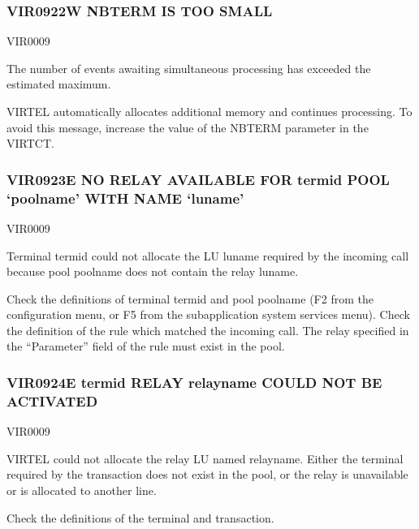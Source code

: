 \documentclass[letterpaper,10pt,english]{sphinxmanual}
\begin{document}
\subsubsection{VIR0922W NBTERM IS TOO SMALL}
\label{\detokenize{messages:vir0922w-nbterm-is-too-small}}\begin{description}
\sphinxAtStartPar
VIR0009

\sphinxAtStartPar
The number of events awaiting simultaneous processing has exceeded the estimated maximum.

\sphinxAtStartPar
VIRTEL automatically allocates additional memory and continues processing. To avoid this message, increase the value of the NBTERM parameter in the VIRTCT.

\end{description}


\subsubsection{VIR0923E NO RELAY AVAILABLE FOR termid POOL ‘poolname’ WITH NAME ‘luname’}
\label{\detokenize{messages:vir0923e-no-relay-available-for-termid-pool-poolname-with-name-luname}}\begin{description}
\sphinxAtStartPar
VIR0009

\sphinxAtStartPar
Terminal termid could not allocate the LU luname required by the incoming call because pool poolname does not contain the relay luname.

\sphinxAtStartPar
Check the definitions of terminal termid and pool poolname (F2 from the configuration menu, or F5 from the sub\sphinxhyphen{}application system services menu). Check the definition of the rule which matched the incoming call. The relay specified in the “Parameter” field of the rule must exist in the pool.

\end{description}


\subsubsection{VIR0924E termid RELAY relayname COULD NOT BE ACTIVATED}
\label{\detokenize{messages:vir0924e-termid-relay-relayname-could-not-be-activated}}\begin{description}
\sphinxAtStartPar
VIR0009

\sphinxAtStartPar
VIRTEL could not allocate the relay LU named relayname. Either the terminal required by the transaction does not exist in the pool, or the relay is unavailable or is allocated to another line.

\sphinxAtStartPar
Check the definitions of the terminal and transaction.

\end{description}
\end{document}
